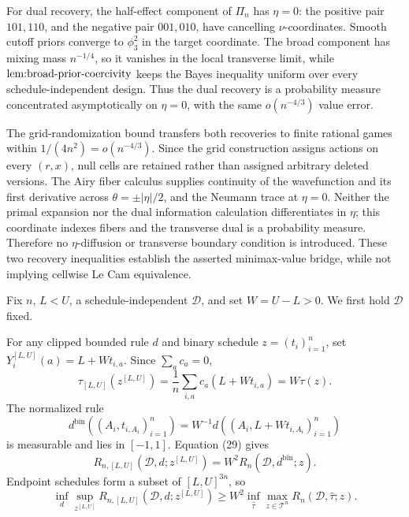 For dual recovery, the half-effect component of \(\Pi_n\) has \(\eta=0\): the positive pair \(101,110\), and the negative pair \(001,010\), have cancelling \(\nu\)-coordinates.  Smooth cutoff priors converge to \(\phi_3^2\) in the target coordinate.  The broad component has mixing mass \(n^{-1/4}\), so it vanishes in the local transverse limit, while \(\textnormal{lem:broad-prior-coercivity}\) keeps the Bayes inequality uniform over every schedule-independent design.  Thus the dual recovery is a probability measure concentrated asymptotically on \(\eta=0\), with the same \(o(n^{-4/3})\) value error.

The grid-randomization bound transfers both recoveries to finite rational games within \(1/(4n^2)=o(n^{-4/3})\).  Since the grid construction assigns actions on every \((r,x)\), null cells are retained rather than assigned arbitrary deleted versions.  The Airy fiber calculus supplies continuity of the wavefunction and its first derivative across \(\theta=\pm|\eta|/2\), and the Neumann trace at \(\eta=0\).  Neither the primal expansion nor the dual information calculation differentiates in \(\eta\); this coordinate indexes fibers and the transverse dual is a probability measure.  Therefore no \(\eta\)-diffusion or transverse boundary condition is introduced.  These two recovery inequalities establish the asserted minimax-value bridge, while not implying cellwise Le Cam equivalence.

Fix \(n\), \(L<U\), a schedule-independent \(\mathcal D\), and set \(W=U-L>0\).  We first hold \(\mathcal D\) fixed.

For any clipped bounded rule \(d\) and binary schedule \(z=(t_i)_{i=1}^n\), set \(Y_i^{[L,U]}(a)=L+Wt_{i,a}\).  Since \(\sum_ac_a=0\),
\[
\tau_{[L,U]}(z^{[L,U]})
=\frac1n\sum_{i,a}c_a(L+Wt_{i,a})=W\tau(z).
\tag{29}
\]
The normalized rule
\[
d^{\mathrm{bin}}((A_i,t_{i,A_i})_{i=1}^n)
=W^{-1}d((A_i,L+Wt_{i,A_i})_{i=1}^n)
\]
is measurable and lies in \([-1,1]\).  Equation (29) gives
\[
R_{n,[L,U]}(\mathcal D,d;z^{[L,U]})
=W^2R_n(\mathcal D,d^{\mathrm{bin}};z).
\]
Endpoint schedules form a subset of \([L,U]^{3n}\), so
\[
\inf_d\sup_{z^{[L,U]}}R_{n,[L,U]}(\mathcal D,d;z^{[L,U]})
\geq W^2\inf_{\widehat\tau}\max_{z\in\mathcal T^n}
R_n(\mathcal D,\widehat\tau;z).
\tag{30}
\]

